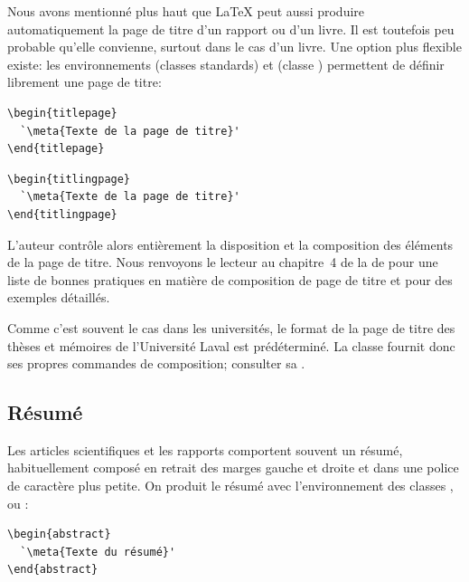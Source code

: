 Nous avons mentionné plus haut que {\LaTeX} peut aussi produire
automatiquement la page de titre d'un rapport ou d'un livre. Il est
toutefois peu probable qu'elle convienne, surtout dans le cas d'un
livre. Une option plus flexible existe: les environnements
 (classes standards) et  (classe
) permettent de définir librement une page de
titre:
\begin{demo}
  \begin{minipage}{0.48\linewidth}
\begin{lstlisting}
\begin{titlepage}
  `\meta{Texte de la page de titre}'
\end{titlepage}
\end{lstlisting}
  \end{minipage}
  \hfill
  \begin{minipage}{0.48\linewidth}
\begin{lstlisting}
\begin{titlingpage}
  `\meta{Texte de la page de titre}'
\end{titlingpage}
\end{lstlisting}
  \end{minipage}
\end{demo}
L'auteur contrôle alors entièrement la disposition et la
composition des éléments de la page de titre. Nous renvoyons le
lecteur au chapitre~4 de la %
de  pour une liste de bonnes pratiques en matière de
composition de page de titre et pour des exemples détaillés.

Comme c'est souvent le cas dans les universités, le format de la page
de titre des thèses et mémoires de l'Université Laval est
prédéterminé. La classe  fournit donc ses propres
commandes de composition; consulter sa %
.

\subsection{Résumé}
\label{sec:organisation:parties:resume}

Les articles scientifiques et les rapports comportent souvent un
résumé, habituellement composé en retrait des marges gauche et droite
et dans une police de caractère plus petite. On produit le résumé avec
l'environnement  des classes ,
 ou :
\begin{lstlisting}
\begin{abstract}
  `\meta{Texte du résumé}'
\end{abstract}
\end{lstlisting}

